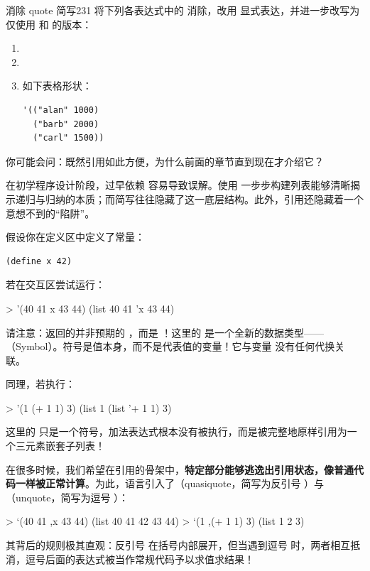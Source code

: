 \begin{exercise}{消除 quote 简写}{231}
将下列各表达式中的  消除，改用  显式表达，并进一步改写为仅使用  和  的版本：
\begin{enumerate}
  \item {}
  \item {}
  \item 如下表格形状：
\begin{lstlisting}[language=BSL]
'(("alan" 1000)
  ("barb" 2000)
  ("carl" 1500))
\end{lstlisting}
\end{enumerate}
\end{exercise}


你可能会问：既然引用如此方便，为什么前面的章节直到现在才介绍它？

在初学程序设计阶段，过早依赖  容易导致误解。使用  一步步构建列表能够清晰揭示递归与归纳的本质；而简写往往隐藏了这一底层结构。此外，引用还隐藏着一个意想不到的“陷阱”。

假设你在定义区中定义了常量：
\begin{lstlisting}[language=BSL]
(define x 42)
\end{lstlisting}
若在交互区尝试运行：
\begin{replbox}
> '(40 41 x 43 44)
(list 40 41 'x 43 44)
\end{replbox}
请注意：返回的并非预期的 ，而是 ！这里的  是一个全新的数据类型——（Symbol）。符号是值本身，而不是代表值的变量！它与变量  没有任何代换关联。

同理，若执行：
\begin{replbox}
> '(1 (+ 1 1) 3)
(list 1 (list '+ 1 1) 3)
\end{replbox}
这里的  只是一个符号，加法表达式根本没有被执行，而是被完整地原样引用为一个三元素嵌套子列表！

在很多时候，我们希望在引用的骨架中，\textbf{特定部分能够逃逸出引用状态，像普通代码一样被正常计算}。为此，语言引入了（quasiquote，简写为反引号 \code{\`{}}）与（unquote，简写为逗号 \code{, }）：
\begin{replbox}
> `(40 41 ,x 43 44)
(list 40 41 42 43 44)
> `(1 ,(+ 1 1) 3)
(list 1 2 3)
\end{replbox}

其背后的规则极其直观：反引号 \code{\`{}} 在括号内部展开，但当遇到逗号 \code{, } 时，两者相互抵消，逗号后面的表达式被当作常规代码予以求值求结果！

